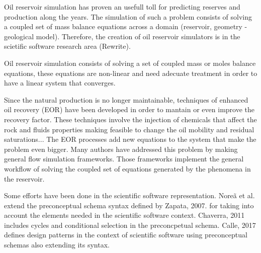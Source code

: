 %
%
%

Oil reservoir simulation has proven an usefull toll for predicting reserves and production along the years. The simulation of such a problem consists of solving a coupled set of mass balance equations across a domain (reservoir, geometry - geological model). Therefore, the creation of oil reservoir simulators is in the scietific software research area (Rewrite). 

Oil reservoir simulation consists of solving a set of coupled mass or moles balance equations, these equations are non-linear and need adecuate treatment in order to have a linear system that converges.

Since the natural production is no longer maintainable, techniques of enhanced oil recovery (EOR) have been developed in order to mantain or even improve the recovery factor. These techniques involve the injection of chemicals that affect the rock and fluids properties making feasible to change the oil mobility and residual saturations... The EOR processes add new equations to the system that make the problem even bigger. Many authors have addressed this problem by making general flow simulation frameworks. Those frameworks implement the general workflow of solving the coupled set of equations generated by the phenomena in the reservoir.

Some efforts have been done in the scientific software representation. Nore\~{a} et al. extend the preconceptual schema syntax defined by Zapata, 2007. for taking into account the elements needed in the scientific software context. Chaverra, 2011 includes cycles and conditional selection in the preconcpetual schema. Calle, 2017 defines design patterns in the context of scientific software using preconceptual schemas also extending its syntax.


